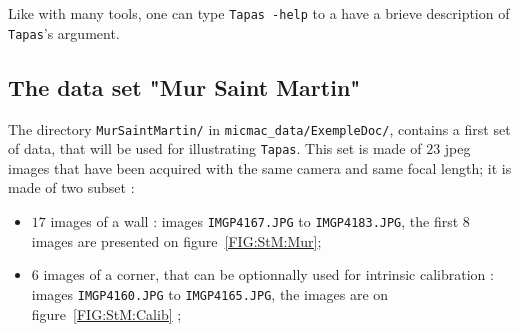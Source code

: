 Like with many tools, one can type {\tt Tapas -help} to a have a brieve description
of {\tt Tapas}'s argument.


\subsection{The data set  "Mur Saint Martin"}



The directory {\tt MurSaintMartin/} in {\tt micmac\_data/ExempleDoc/}, contains 
a first set of data, that will be used for illustrating {\tt Tapas}.
This set is made of $23$ jpeg images that have been acquired with the same
camera and same focal length; it is made of two subset :

\begin{itemize}
    \item $17$ images of a wall : images {\tt IMGP4167.JPG} to {\tt IMGP4183.JPG}, the first
          $8$ images are presented on figure~\ref{FIG:StM:Mur};
    \item $6$ images of a corner, that can be optionnally used for intrinsic calibration
           : images {\tt IMGP4160.JPG} to {\tt IMGP4165.JPG}, the images are on figure~\ref{FIG:StM:Calib} ;
\end{itemize}



